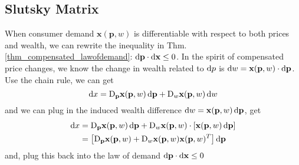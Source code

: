 \subsection{Slutsky Matrix}
When consumer demand $\mathbf{x}(\mathbf{p},w)$ is differentiable with respect to both prices and wealth, we can rewrite the inequality in Thm.\ref{thm_compensated_lawofdemand}: $\mathop{}\!\mathrm{d} \mathbf{p}\cdot \mathop{}\!\mathrm{d} \mathbf{x}\leq 0$. In the spirit of compensated price changes, we know the change in wealth related to $\mathop{}\!\mathrm{d} p$ is $\mathop{}\!\mathrm{d} w=\mathbf{x}(\mathbf{p},w)\cdot \mathop{}\!\mathrm{d} \mathbf{p}$.
Use the chain rule, we can get
$$\mathop{}\!\mathrm{d} x= \mathop{}\!\mathrm{D}_{\mathbf{p}}\mathbf{x}(\mathbf{p},w)\mathop{}\!\mathrm{d} \mathbf{p} + \mathop{}\!\mathrm{D}_w \mathbf{x}(\mathbf{p},w)\mathop{}\!\mathrm{d} w$$
and we can plug in the induced wealth difference $\mathop{}\!\mathrm{d} w=\mathbf{x}(\mathbf{p},w)\mathop{}\!\mathrm{d} \mathbf{p}$, get
\begin{align*}
    \diff x & = \mdiff_{\mathbf{p}}\mathbf{x}(\mathbf{p},w)\diff \mathbf{p} + \mdiff_w \mathbf{x}(\mathbf{p},w) \cdot \left[\mathbf{x}(\mathbf{p},w)\diff \mathbf{p}\right]\\
    & =\left[ \mdiff_{\mathbf{p}}\mathbf{x}(\mathbf{p},w) + \mdiff_w \mathbf{x}(\mathbf{p},w)\mathbf{x}(\mathbf{p},w)^T\right] \diff \mathbf{p}
\end{align*}
and, plug this back into the law of demand $ \mathop{}\!\mathrm{d} \mathbf{p}\cdot \mathop{}\!\mathrm{d} \mathbf{x}\leq 0$